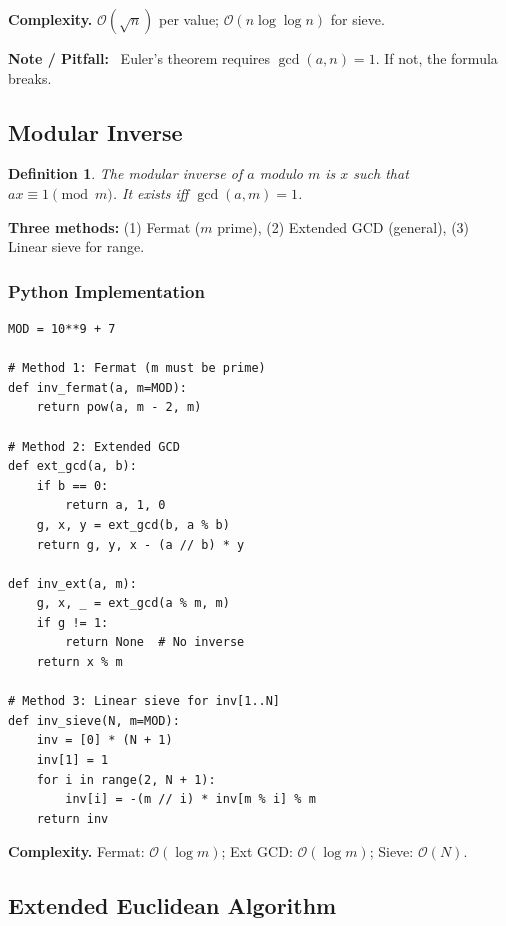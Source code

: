 \documentclass[10pt,a4paper]{article}
\theoremstyle{cpstyle}
\newtheorem{definition}[theorem]{Definition}
\newenvironment{cpnote}{%
  \begin{mdframed}[backgroundcolor=notebg, linecolor=orange!70, linewidth=1pt,
    innerleftmargin=10pt, innerrightmargin=10pt, innertopmargin=6pt, innerbottommargin=6pt]
  \textbf{\color{orange!80!black}Note / Pitfall:}~}{%
  \end{mdframed}}
\newcommand{\bigO}[1]{\mathcal{O}\!\left(#1\right)}
\begin{document}
\textbf{Complexity.} $\bigO{\sqrt{n}}$ per value; $\bigO{n \log \log n}$ for sieve.

\begin{cpnote}
Euler's theorem requires $\gcd(a,n)=1$. If not, the formula breaks.
\end{cpnote}

\subsection{Modular Inverse}

\begin{definition}
The modular inverse of $a$ modulo $m$ is $x$ such that $ax \equiv 1 \pmod{m}$. It exists iff $\gcd(a,m)=1$.
\end{definition}

\textbf{Three methods:} (1) Fermat ($m$ prime), (2) Extended GCD (general), (3) Linear sieve for range.

\subsubsection{Python Implementation}
\begin{lstlisting}[caption={Modular Inverse -- three methods}]
MOD = 10**9 + 7

# Method 1: Fermat (m must be prime)
def inv_fermat(a, m=MOD):
    return pow(a, m - 2, m)

# Method 2: Extended GCD
def ext_gcd(a, b):
    if b == 0:
        return a, 1, 0
    g, x, y = ext_gcd(b, a % b)
    return g, y, x - (a // b) * y

def inv_ext(a, m):
    g, x, _ = ext_gcd(a % m, m)
    if g != 1:
        return None  # No inverse
    return x % m

# Method 3: Linear sieve for inv[1..N]
def inv_sieve(N, m=MOD):
    inv = [0] * (N + 1)
    inv[1] = 1
    for i in range(2, N + 1):
        inv[i] = -(m // i) * inv[m % i] % m
    return inv
\end{lstlisting}

\textbf{Complexity.} Fermat: $\bigO{\log m}$; Ext GCD: $\bigO{\log m}$; Sieve: $\bigO{N}$.

\subsection{Extended Euclidean Algorithm}
\end{document}
